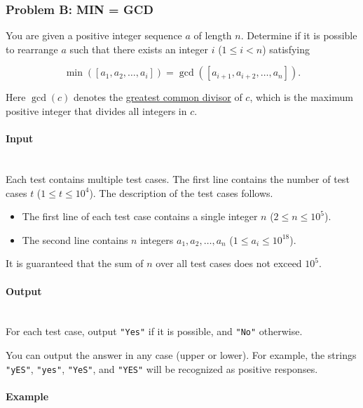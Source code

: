 \documentclass{article}
\begin{document}
\subsubsection{Problem B: MIN = GCD}

You are given a positive integer sequence $a$ of length $n$. Determine if it is possible to rearrange $a$ such that there exists an integer $i$ ($1 \le i < n$) satisfying

\[
\min([a_1, a_2, \ldots, a_i]) = \gcd([a_{i+1}, a_{i+2}, \ldots, a_n]).
\]

Here $\gcd(c)$ denotes the \href{https://en.wikipedia.org/wiki/Greatest_common_divisor}{greatest common divisor} of $c$, which is the maximum positive integer that divides all integers in $c$.


\paragraph{Input} \mbox{} \\

Each test contains multiple test cases. The first line contains the number of test cases $t$ ($1 \le t \le 10^4$). The description of the test cases follows.

\begin{itemize}
    \item The first line of each test case contains a single integer $n$ ($2 \le n \le 10^5$).
    \item The second line contains $n$ integers $a_1, a_2, \ldots, a_n$ ($1 \le a_i \le 10^{18}$).
\end{itemize}

It is guaranteed that the sum of $n$ over all test cases does not exceed $10^5$.

\paragraph{Output}\mbox{} \\


For each test case, output \texttt{"Yes"} if it is possible, and \texttt{"No"} otherwise.

You can output the answer in any case (upper or lower). For example, the strings \texttt{"yES"}, \texttt{"yes"}, \texttt{"YeS"}, and \texttt{"YES"} will be recognized as positive responses.

\paragraph{Example}\mbox{} \\
\end{document}
